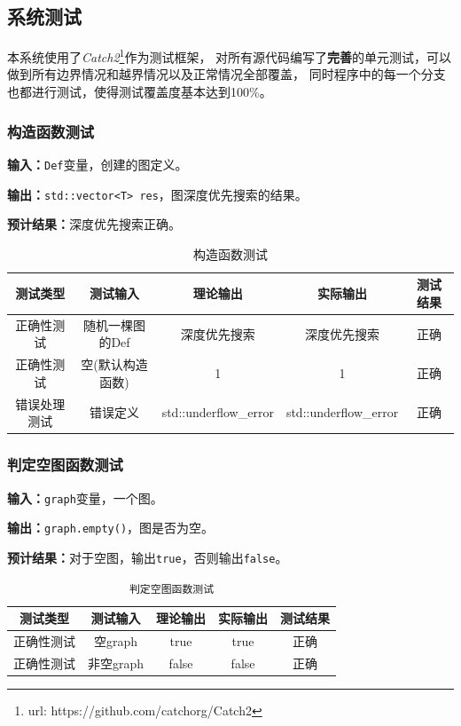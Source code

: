 \subsection{系统测试}
本系统使用了\textit{Catch2}\footnote{url: https://github.com/catchorg/Catch2}作为测试框架，
对所有源代码编写了\textbf{完善}的单元测试，可以做到所有边界情况和越界情况以及正常情况全部覆盖，
同时程序中的每一个分支也都进行测试，使得测试覆盖度基本达到100\%。
\subsubsection{构造函数测试}
\textbf{输入：}\texttt{Def}变量，创建的图定义。
\par
\textbf{输出：}\texttt{std::vector<T> res}，图深度优先搜索的结果。
\par
\textbf{预计结果：}深度优先搜索正确。
\begin{table}[h]
\centering
\caption{构造函数测试}
\begin{tabular}{@{}ccccc@{}}
\toprule
\multicolumn{1}{c}{测试类型}    & \multicolumn{1}{c}{测试输入} & \multicolumn{1}{c}{理论输出} & \multicolumn{1}{c}{实际输出} & \multicolumn{1}{c}{测试结果} \\ \midrule
\multicolumn{1}{c|}{正确性测试}  & 随机一棵图的Def&深度优先搜索&深度优先搜索&正确\\
\multicolumn{1}{c|}{正确性测试}  & 空(默认构造函数)&1&1&正确\\
\multicolumn{1}{c|}{错误处理测试} & 错误定义& std::underflow\_error& std::underflow\_error& 正确\\ \bottomrule
\end{tabular}
\label{tab:inittest4}
\end{table}

\subsubsection{判定空图函数测试}
\textbf{输入：}\texttt{graph}变量，一个图。
\par
\textbf{输出：}\texttt{graph.empty()}，图是否为空。
\par
\textbf{预计结果：}对于空图，输出\texttt{true}，否则输出\texttt{false}。
\begin{table}[h]
\centering
    \caption{\texttt{判定空图函数测试}}
\begin{tabular}{@{}ccccc@{}}
\toprule
\multicolumn{1}{c}{测试类型}    & \multicolumn{1}{c}{测试输入} & \multicolumn{1}{c}{理论输出} & \multicolumn{1}{c}{实际输出} & \multicolumn{1}{c}{测试结果} \\ \midrule
\multicolumn{1}{c|}{正确性测试}  & 空graph&true&true&正确\\
\multicolumn{1}{c|}{正确性测试}  & 非空graph&false&false&正确\\ \bottomrule
\end{tabular}
\label{tab:emptytest4}
\end{table}



